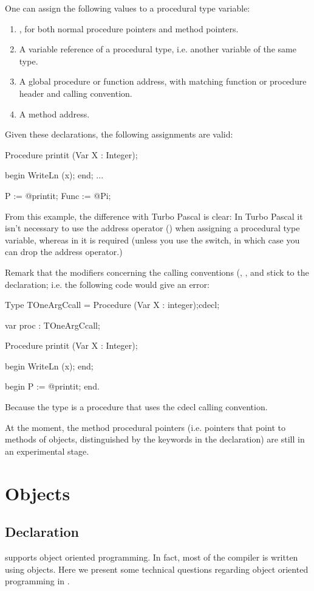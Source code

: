 \documentclass{report}
\begin{document}
One can assign the following values to a procedural type variable:
\begin{enumerate}
\item {}, for both normal procedure pointers and method pointers.
\item A variable reference of a procedural type, i.e. another variable of
the same type.
\item A global procedure or function address, with matching function or
procedure header and calling convention.
\item A method address.
\end{enumerate}

Given these declarations, the following assignments are valid:
\begin{listing}
Procedure printit (Var X : Integer);

begin
  WriteLn (x);
end;
...

P := @printit;
Func := @Pi;
\end{listing}
From this example, the difference with Turbo Pascal is clear: In Turbo
Pascal it isn't necessary to use the address operator () 
when assigning a procedural type variable, whereas in \fpc it is required
(unless you use the  switch, in which case you can drop the address
operator.)

Remark that the modifiers concerning the calling conventions (,
,  and  stick to the declaration;
i.e. the following code would give an error:
\begin{listing}
Type TOneArgCcall = Procedure (Var X : integer);cdecl;

var proc : TOneArgCcall;

Procedure printit (Var X : Integer);

begin
  WriteLn (x);
end;

begin
P := @printit;
end.
\end{listing}
Because the  type is a procedure that uses the cdecl
calling convention. 

At the moment, the method procedural pointers (i.e. pointers that point to
methods of objects, distinguished by the  keywords in the
declaration) are still in an experimental stage.

\chapter{Objects}

\section{Declaration}
\fpc supports object oriented programming. In fact, most  of the compiler is
written using objects. Here we present some technical questions regarding
object oriented programming in \fpc.
\end{document}
